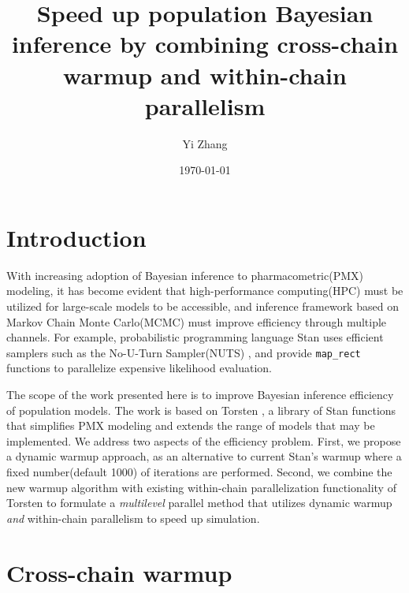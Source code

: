 \documentclass[11pt, reqno, oneside]{amsart}
\author{Yi Zhang}
\date{\today}
\title{Speed up population Bayesian inference by combining cross-chain warmup and within-chain parallelism}
\begin{document}
\maketitle

\section{Introduction}
\label{sec:orga196c19}
With increasing adoption of Bayesian inference to
pharmacometric(PMX) modeling, it has become evident that
high-performance computing(HPC) must be utilized for large-scale
models to be accessible, and inference framework based on Markov Chain
Monte Carlo(MCMC) must improve efficiency through multiple
channels. For example, probabilistic programming language Stan \cite{carpenter_stan_2017}
uses efficient samplers such as the No-U-Turn
Sampler(NUTS) \cite{hoffman_no-u-turn_2014}, and provide \texttt{map_rect} functions
to parallelize expensive likelihood evaluation.

The scope of the work presented here is to improve Bayesian inference
efficiency of population models. The work is based on Torsten
\cite{Torsten}, a library of Stan functions that
simplifies PMX modeling and
extends the range of models that may be implemented. We address two
aspects of the efficiency problem. First, we propose a dynamic warmup
approach, as an alternative to current Stan's warmup where a fixed
number(default 1000) of iterations are performed. Second, we combine
the new warmup algorithm with existing within-chain parallelization
functionality of Torsten \cite{torsten_pmx_group} to formulate a \emph{multilevel} parallel method
that utilizes dynamic warmup \emph{and} within-chain parallelism to speed
up simulation.

\section{Cross-chain warmup}
\label{sec:org5b4c5f7}
\end{document}
